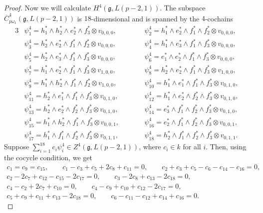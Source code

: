 \documentclass[10pt,a4paper]{amsart}
\numberwithin{equation}{section}
\begin{document}
\begin{proof}
Now we will calculate $H^4(\mathfrak{g},L(p-2,1))$. The subspace $\overline{C}^4_{p\omega_1}(\mathfrak{g},L(p-2,1))$ is $18$-dimensional and is spanned by the $4$-cochains
\begin{alignat*}{3}
&\psi_1^4=h_1^*\wedge h_2^*\wedge e_2^*\wedge f_3^*\otimes v_{0,0,0},\qquad&&
\psi_2^4=h_1^*\wedge e_2^*\wedge f_1^*\wedge f_2^*\otimes v_{0,0,0},&
\\
&\psi_3^4=h_2^*\wedge e_2^*\wedge f_1^*\wedge f_2^*\otimes v_{0,0,0},\qquad&&
\psi_4^4=h_1^*\wedge e_3^*\wedge f_1^*\wedge f_3^*\otimes v_{0,0,0},&
\\
&\psi_5^4=h_2^*\wedge e_3^*\wedge f_1^*\wedge f_3^*\otimes v_{0,0,0},\qquad&&
\psi_6^4=e_1^*\wedge e_2^*\wedge f_1^*\wedge f_3^*\otimes v_{0,0,0},&
\\
&\psi_7^4=h_1^*\wedge e_2^*\wedge f_1^*\wedge f_3^*\otimes v_{1,0,0},\qquad&&
\psi_8^4=h_2^*\wedge e_2^*\wedge f_1^*\wedge f_3^*\otimes v_{1,0,0},&
\\
&\psi_9^4=h_1^*\wedge h_2^*\wedge f_1^*\wedge f_2^*\otimes v_{1,0,0},\qquad&&
\psi_{10}^4=h_1^*\wedge e_1^*\wedge f_1^*\wedge f_3^*\otimes v_{0,1,0},&
\\
&\psi_{11}^4=h_2^*\wedge e_1^*\wedge f_1^*\wedge f_3^*\otimes v_{0,1,0},\qquad&&
\psi_{12}^4=h_1^*\wedge e_2^*\wedge f_2^*\wedge f_3^*\otimes v_{0,1,0},&
\\
&\psi_{13}^4=h_2^*\wedge e_2^*\wedge f_2^*\wedge f_3^*\otimes v_{0,1,0},\qquad&&
\psi_{14}^4=e_3^*\wedge f_1^*\wedge f_2^*\wedge f_3^*\otimes v_{0,1,0},&
\\
&\psi_{15}^4=h_1^*\wedge h_2^*\wedge f_1^*\wedge f_3^*\otimes v_{0,0,1},\qquad&&
\psi_{16}^4=e_2^*\wedge f_1^*\wedge f_2^*\wedge f_3^*\otimes v_{0,0,1},&
\\
&\psi_{17}^4=h_1^*\wedge f_1^*\wedge f_2^*\wedge f_3^*\otimes v_{0,1,1},\qquad&&
\psi_{18}^4=h_2^*\wedge f_1^*\wedge f_2^*\wedge f_3^*\otimes v_{0,1,1}.&
\end{alignat*}
Suppose $\sum_{i=1}^{18}c_i\psi_i^4\in Z^4(\mathfrak{g},L(p-2,1))$, where $c_i\in k$ for all $i$. Then, using the cocycle condition, we get
\begin{gather*}
c_1=c_9=c_{15},
\qquad
c_1-c_3+c_5+2c_8+c_{11}=0,
\qquad
c_2+c_3+c_5-c_6-c_{14}-c_{16}=0,
\\
c_2-2c_7+c_{12}-c_{15}-2c_{17}=0,
\qquad
c_3-2c_8+c_{13}-2c_{18}=0,
\\
c_4-c_2+2c_7+c_{10}=0,
\qquad
c_4-c_9+c_{10}+c_{12}-2c_{17}=0,
\\
c_5+c_9+c_{11}+c_{13}-2c_{18}=0,
\qquad
c_6-c_{11}-c_{12}+c_{14}+c_{16}=0.

\end{gather*}
\end{proof}
\end{document}
